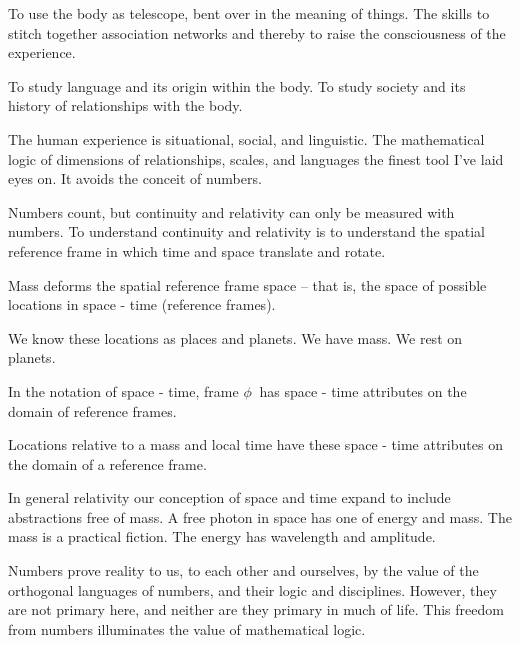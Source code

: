 

To use the body as telescope, bent over in the meaning of things.  The
skills to stitch together association networks and thereby to raise
the consciousness of the experience.

To study language and its origin within the body.  To study society
and its history of relationships with the body.  

The human experience is situational, social, and linguistic.  The
mathematical logic of dimensions of relationships, scales, and
languages the finest tool I've laid eyes on.  It avoids the conceit of numbers.  

Numbers count, but continuity and relativity can only be measured with
numbers.  To understand continuity and relativity is to understand the
spatial reference frame in which time and space translate and rotate.

Mass deforms the spatial reference frame space -- that is, the space
of possible locations in space - time (reference frames).

We know these locations as places and planets.  We have mass.  We rest
on planets.

In the notation of space - time, frame $\phi\ $ has space - time
attributes on the domain of reference frames.  

Locations relative to a mass and local time have these space - time
attributes on the domain of a reference frame.

In general relativity our conception of space and time expand to
include abstractions free of mass.  A free photon in space has one of
energy and mass.  The mass is a practical fiction.  The energy has
wavelength and amplitude.

Numbers prove reality to us, to each other and ourselves, by the value
of the orthogonal languages of numbers, and their logic and
disciplines.  However, they are not primary here, and neither are they
primary in much of life.  This freedom from numbers illuminates the
value of mathematical logic.

\bye
